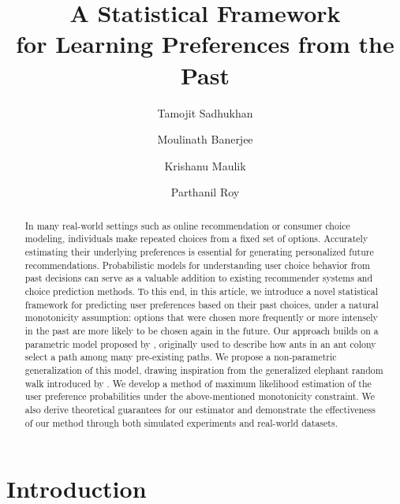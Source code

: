 \documentclass[12pt]{amsart}
\title[Learning Preferences from the Past]{A Statistical Framework \\ for Learning Preferences from the Past}
\author[T. Sadhukhan]{Tamojit Sadhukhan}
\author[M. Banerjee]{Moulinath Banerjee}
\author[K. Maulik]{Krishanu Maulik}
\author[P. Roy]{Parthanil Roy}
\theoremstyle{plain}
\theoremstyle{remark}
\numberwithin{equation}{section}
\begin{document}
\begin{abstract}
In many real-world settings such as online recommendation or consumer choice modeling, individuals make repeated choices from a fixed set of options. Accurately estimating their underlying preferences is essential for generating personalized future recommendations. Probabilistic models for understanding user choice behavior from past decisions can serve as a valuable addition to existing recommender systems and choice prediction methods. To this end, in this article, we introduce a novel statistical framework for predicting user preferences based on their past choices, under a natural monotonicity assumption: options that were chosen more frequently or more intensely in the past are more likely to be chosen again in the future.  Our approach builds on a parametric model proposed by \cite{MR3657899}, originally used to describe how ants in an ant colony select a path among many pre-existing paths. We propose a non-parametric generalization of this model, drawing inspiration from the generalized elephant random walk introduced by \cite{gerw}. We develop a method of maximum likelihood estimation of the user preference probabilities under the above-mentioned monotonicity constraint. We also derive theoretical guarantees for our estimator and demonstrate the effectiveness of our method through both simulated experiments and real-world datasets. 
\end{abstract}



\maketitle

\section{Introduction}\label{sec1}
\end{document}
